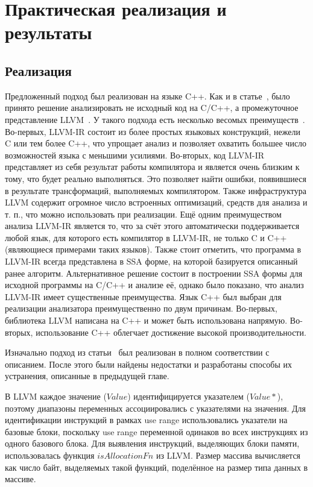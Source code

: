\chapter{Практическая реализация и результаты}

\section{Реализация}

Предложенный подход был реализован на языке C++.  Как и в
статье~\cite{li2010practical}, было принято решение анализировать не
исходный код на C/C++, а промежуточное представление
LLVM~\cite{lattner2004llvm}. У такого подхода есть несколько весомых
преимуществ~\cite{merz2012llbmc}. Во-первых, LLVM-IR состоит из более
простых языковых конструкций, нежели C или тем более C++, что упрощает
анализ и позволяет охватить большее число возможностей языка с
меньшими усилиями. Во-вторых, код LLVM-IR представляет из себя
результат работы компилятора и является очень близким к тому, что
будет реально выполняться. Это позволяет найти ошибки, появившиеся в
результате трансформаций, выполняемых компилятором. Также
инфраструктура LLVM содержит огромное число встроенных оптимизаций,
средств для анализа и т. п., что можно использовать при
реализации. Ещё одним преимуществом анализа LLVM-IR является то, что
за счёт этого автоматически поддерживается любой язык, для которого
есть компилятор в LLVM-IR, не только C и C++ (являющиеся примерами
таких языков). Также стоит отметить, что программа в LLVM-IR всегда
представлена в SSA форме, на которой базируется описанный ранее
алгоритм. Альтернативное решение состоит в построении SSA формы для
исходной программы на C/C++ и анализе её, однако было показано, что
анализ LLVM-IR имеет существенные преимущества. Язык C++ был выбран
для реализации анализатора преимущественно по двум
причинам. Во-первых, библиотека LLVM написана на C++ и может быть
использована напрямую. Во-вторых, использование C++ облегчает
достижение высокой производительности.

Изначально подход из статьи~\cite{li2010practical} был реализован в
полном соответствии с описанием. После этого были найдены недостатки и
разработаны способы их устранения, описанные в предыдущей главе.

В LLVM каждое значение ($Value$) идентифицируется указателем
($Value *$), поэтому диапазоны переменных ассоциировались с
указателями на значения. Для идентификации инструкций в рамках use
range использовались указатели на базовые блоки, поскольку use range
переменной одинаков во всех инструкциях из одного базового блока. Для
выявления инструкций, выделяющих блоки памяти, использовалась функция
$isAllocationFn$ из LLVM. Размер массива вычисляется как число байт,
выделяемых такой функций, поделённое на размер типа данных в массиве.

